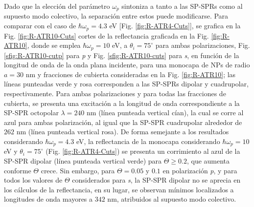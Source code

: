 Dado que la elección del parámetro $\omega_p$ sintoniza a tanto a las SP-SPRs como al supuesto modo colectivo, la separación entre estos puede modificarse. Para comparar con el caso de $\hbar\omega_p=4.3$ eV [Fig. \ref{fig:R-ATR4-Cuts}], se grafica en la Fig. \ref{fig:R-ATR10-Cuts} cortes de la reflectancia graficada en la Fig. \ref{fig:R-ATR10}, donde se emplea $\hbar\omega_p = 10$ eV, a $\theta_i = 75^\circ$ para ambas polarizaciones,  Fig. \ref{sfig:R-ATR10-cutp} para \emph{p} y Fig. \ref{sfig:R-ATR10-cuts} para \emph{s}, en  función de la longitud de onda de la onda plana incidente, para una monocapa de NPs de radio $a= 30$ nm  y fracciones de cubierta consideradas en la Fig. \ref{fig:R-ATR10}; las líneas punteadas verde y rosa  corresponden a las SP-SPRs dipolar y cuadrupolar, respectivamente. Para ambas polarizaciones y para todas las fracciones de cubierta, se presenta una excitación a la longitud de onda correspondiente a la SP-SPR octopolar $\lambda=240$ nm (línea punteada vertical cían), la cual se corre al azul para ambas polarización, al igual que  la SP-SPR cuadrupolar alrededor de $262$ nm (línea punteada vertical rosa). De forma semejante a los resultados considerando $\hbar\omega_p = 4.3$ eV, la reflectancia de la monocapa considerando $\hbar\omega_p=10$ eV y $\theta_i=75^\circ$ (Fig. \ref{fig:R-ATR4-Cuts}) se presenta un corrimiento al azul de la SP-SPR dipolar (línea punteada vertical verde) para $\Theta\geq 0.2$, que aumenta conforme $\Theta$ crece. Sin embargo, para $\Theta=0.05$ y $0.1$ en polarización \emph{p}, y para todos los valores de $\Theta$ considerados para \emph{s}, la SP-SPR dipolar no se aprecia en los cálculos de la reflectancia, en su lugar, se observan mínimos  localizados a longitudes de onda mayores a $342$ nm, atribuidos al supuesto modo colectivo.

